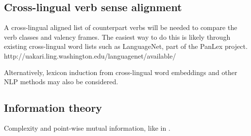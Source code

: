\subsection{Cross-lingual verb sense alignment}

A cross-lingual aligned list of counterpart verbs will be needed to compare the verb classes and valency frames. The easiest way to do this is likely through existing cross-lingual word lists such as LanguageNet, part of the PanLex project. http://uakari.ling.washington.edu/languagenet/available/

Alternatively, lexicon induction from cross-lingual word embeddings and other NLP methods may also be considered.

\subsection{Information theory}

Complexity and point-wise mutual information, like in \citet{say2014}.